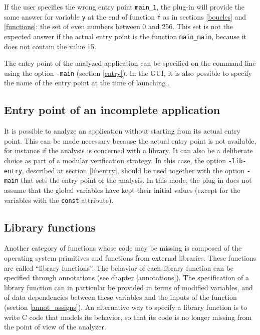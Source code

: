 \documentclass{frama-c-book}
\begin{document}

If the user specifies the wrong
entry point \lstinline|main_1|, the plug-in will provide the
same answer for variable \lstinline|y| at the end of function \lstinline|f| as
in sections \ref{boucles} and \ref{functions}: the set of even numbers
between 0 and 256. This set is not the expected answer if the actual
entry point is the function \lstinline|main_main|, because it does not
contain the value 15.

The entry point of the analyzed application can be specified
on the command line using the option \lstinline|-main| (section \ref{entry}).
In the GUI,
it is also possible to specify the name of the entry point at
the time of launching \Eva{}.

\subsection{Entry point of an incomplete application}

It is possible to analyze an application without starting from its
actual entry point. This can be made necessary because the actual
entry point is not available, for instance if the analysis is
concerned with a library. It can also be a deliberate choice as part
of a modular verification strategy.  In this case, the option
\lstinline|-lib-entry|, described at section \ref{libentry}, should be used
together with the option \lstinline|-main| that sets the entry point of the
analysis.  In this mode, the plug-in does not assume that the global
variables have kept their initial values (except for the variables
with the \lstinline|const| attribute).

\subsection{Library functions}

Another category of functions whose code may be missing is composed
of the operating system primitives and functions from external libraries.
These functions are called ``library functions''.
The behavior of each library function can be specified through
annotations (see chapter \ref{annotations}).
The specification of a library function can in particular be
provided in terms of modified variables, and of data dependencies
between these variables and the inputs of the function
(section \ref{annot_assigns}). An alternative way to specify
a library function is to write C code that models its behavior,
so that its code is no longer missing from the point of view of the
analyzer.
\end{document}
